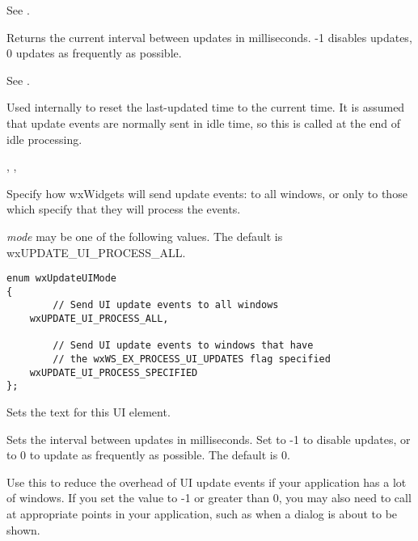 See .

\label{wxupdateuieventgetupdateinterval}


Returns the current interval between updates in milliseconds.
-1 disables updates, 0 updates as frequently as possible.

See .

\label{wxupdateuieventresetupdatetime}


Used internally to reset the last-updated time to the
current time. It is assumed that update events are
normally sent in idle time, so this is called at the end of
idle processing.


, 
, 

\label{wxupdateuieventsetmode}


Specify how wxWidgets will send update events: to
all windows, or only to those which specify that they
will process the events.

{\it mode} may be one of the following values.
The default is wxUPDATE\_UI\_PROCESS\_ALL.

\begin{verbatim}
enum wxUpdateUIMode
{
        // Send UI update events to all windows
    wxUPDATE_UI_PROCESS_ALL,

        // Send UI update events to windows that have
        // the wxWS_EX_PROCESS_UI_UPDATES flag specified
    wxUPDATE_UI_PROCESS_SPECIFIED
};
\end{verbatim}

\label{wxupdateuieventsettext}


Sets the text for this UI element.

\label{wxupdateuieventsetupdateinterval}


Sets the interval between updates in milliseconds.
Set to -1 to disable updates, or to 0 to update as frequently as possible.
The default is 0.

Use this to reduce the overhead of UI update events if your application
has a lot of windows. If you set the value to -1 or greater than 0,
you may also need to call  
at appropriate points in your application, such as when a dialog
is about to be shown.

